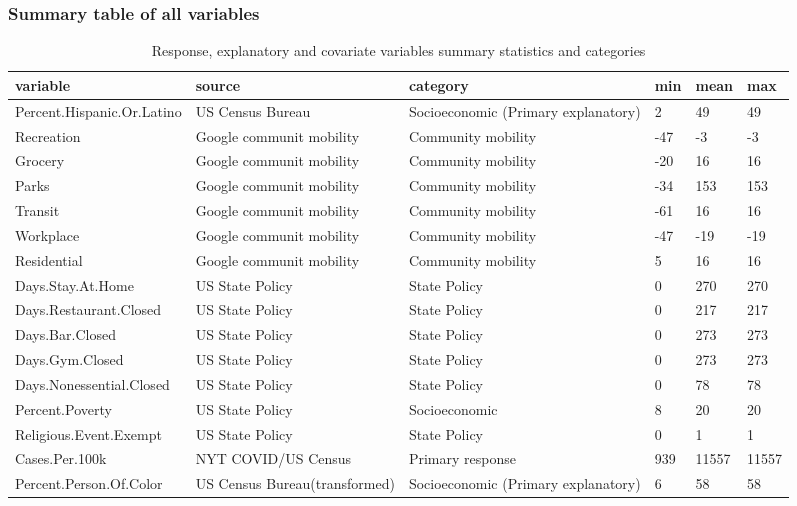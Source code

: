 \documentclass[
]{article}
\begin{document}
\hypertarget{summary-table-of-all-variables}{%
\subsubsection{Summary table of all
variables}\label{summary-table-of-all-variables}}

\begin{table}[!h]

\caption{\label{tab:unnamed-chunk-2}Response, explanatory and covariate variables summary statistics and categories}
\centering
\begin{tabular}[t]{l|l|>{\raggedright\arraybackslash}p{3cm}|l|l|l}
\hline
variable & source & category & min & mean & max\\
\hline
Percent.Hispanic.Or.Latino & US Census Bureau & Socioeconomic (Primary explanatory) & 2 & 49 & 49\\
\hline
Recreation & Google communit mobility & Community mobility & -47 & -3 & -3\\
\hline
Grocery & Google communit mobility & Community mobility & -20 & 16 & 16\\
\hline
Parks & Google communit mobility & Community mobility & -34 & 153 & 153\\
\hline
Transit & Google communit mobility & Community mobility & -61 & 16 & 16\\
\hline
Workplace & Google communit mobility & Community mobility & -47 & -19 & -19\\
\hline
Residential & Google communit mobility & Community mobility & 5 & 16 & 16\\
\hline
Days.Stay.At.Home & US State Policy & State Policy & 0 & 270 & 270\\
\hline
Days.Restaurant.Closed & US State Policy & State Policy & 0 & 217 & 217\\
\hline
Days.Bar.Closed & US State Policy & State Policy & 0 & 273 & 273\\
\hline
Days.Gym.Closed & US State Policy & State Policy & 0 & 273 & 273\\
\hline
Days.Nonessential.Closed & US State Policy & State Policy & 0 & 78 & 78\\
\hline
Percent.Poverty & US State Policy & Socioeconomic & 8 & 20 & 20\\
\hline
Religious.Event.Exempt & US State Policy & State Policy & 0 & 1 & 1\\
\hline
Cases.Per.100k & NYT COVID/US Census & Primary response & 939 & 11557 & 11557\\
\hline
Percent.Person.Of.Color & US Census Bureau(transformed) & Socioeconomic (Primary explanatory) & 6 & 58 & 58\\
\hline
\end{tabular}
\end{table}
\end{document}
